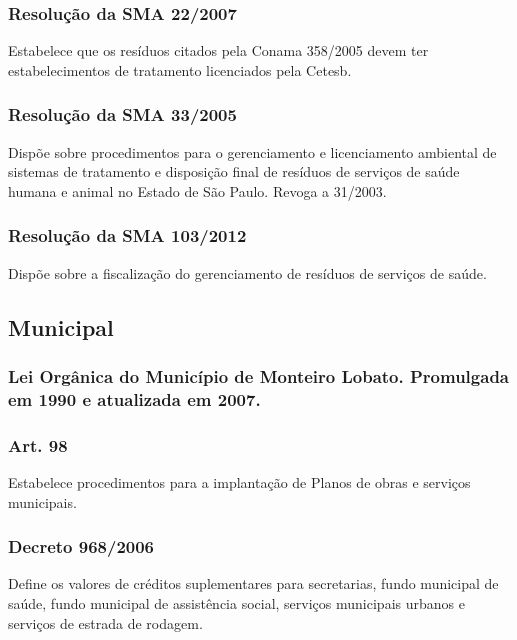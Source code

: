 \begin{subapend}
\begin{subsubapend}
		\subsubsection{Resolução da SMA 22/2007}
		Estabelece que os resíduos citados pela Conama 358/2005 devem ter estabelecimentos de tratamento licenciados pela Cetesb.
		\subsubsection{Resolução da SMA 33/2005}
		Dispõe sobre procedimentos para o gerenciamento e licenciamento ambiental de sistemas de tratamento e disposição final de resíduos de serviços de saúde humana e animal no Estado de São Paulo. Revoga a 31/2003.
		\subsubsection{Resolução da SMA 103/2012}
		Dispõe sobre a fiscalização do gerenciamento de resíduos de serviços de saúde.
	\end{subsubapend}
\end{subapend}


\begin{subapend}
	\subsection{Municipal}
	\begin{subsubapend}
		\item \subsubsection{Lei Orgânica do Município de Monteiro Lobato. Promulgada em 1990 e atualizada em 2007.}
		\subsubsection{Art. 98}
		Estabelece procedimentos para a implantação de Planos de obras e serviços municipais.
		\subsubsection{Decreto 968/2006}
		Define os valores de créditos suplementares para secretarias, fundo municipal de saúde, fundo municipal de assistência social, serviços municipais urbanos e serviços de estrada de rodagem.
	\end{subsubapend}
\end{subapend}


